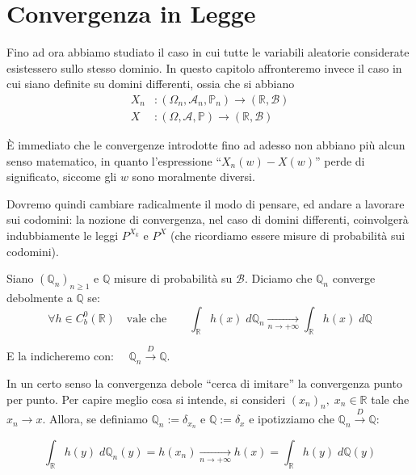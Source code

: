 \section{Convergenza in Legge}
Fino ad ora abbiamo studiato il caso in cui tutte le variabili aleatorie considerate esistessero sullo stesso dominio. In questo capitolo affronteremo invece il caso in cui siano definite su domini differenti, ossia che si abbiano
\begin{align*}
     X_n &: (\Omega_n, \mathcal{A}_n, \mathbb{P}_n)\to (\mathbb R, \mathcal{B})\\
     X &: (\Omega, \mathcal{A}, \mathbb{P})\to (\mathbb R, \mathcal{B})
\end{align*}

È immediato che le convergenze introdotte fino ad adesso non abbiano più alcun senso matematico, in quanto l'espressione ``$X_n(w) - X(w)$'' perde di significato, siccome gli $w$ sono moralmente diversi.

\bigskip
\noindent Dovremo quindi cambiare radicalmente il modo di pensare, ed andare a lavorare sui codomini: la nozione di convergenza, nel caso di domini differenti, coinvolgerà indubbiamente le leggi $P^{X_k}$ e $P^X$ (che ricordiamo essere misure di probabilità sui codomini).

\begin{definizione}
    Siano $(\mathbb Q_n)_{n\geq1}$ e $\mathbb Q$ misure di probabilità su $\mathcal{B}$. Diciamo che $\mathbb{Q}_n$ converge debolmente a $\mathbb{Q}$ se: 
    \[\forall h\in C_b^0(\mathbb R)\quad \text{vale che}\qquad \int_\mathbb{R}h(x)\;d\mathbb{Q}_n \underset{n\to+\infty }{\longrightarrow} \int_\mathbb{R}h(x)\;d\mathbb{Q}\]

    E la indicheremo con: $\quad \mathbb Q_n\overset{D}{\longrightarrow}\mathbb Q$.

    \bigskip

\end{definizione}

In un certo senso la convergenza debole ``cerca di imitare'' la convergenza punto per punto. Per capire meglio cosa si intende, si consideri $(x_n)_n,\;x_n\in\mathbb R$ tale che $x_n\longrightarrow x.$ Allora, se definiamo $\mathbb Q_n := \delta_{x_n}$ e $\mathbb Q := \delta_x$ e ipotizziamo che $\mathbb Q_n\overset{D}{\longrightarrow}\mathbb Q$:

\[\int_\mathbb{R}h(y)\;d\mathbb{Q}_n(y) = h(x_n) \underset{n\to+\infty}{\longrightarrow} h(x) = \int_\mathbb{R}h(y)\;d\mathbb{Q}(y)\]

